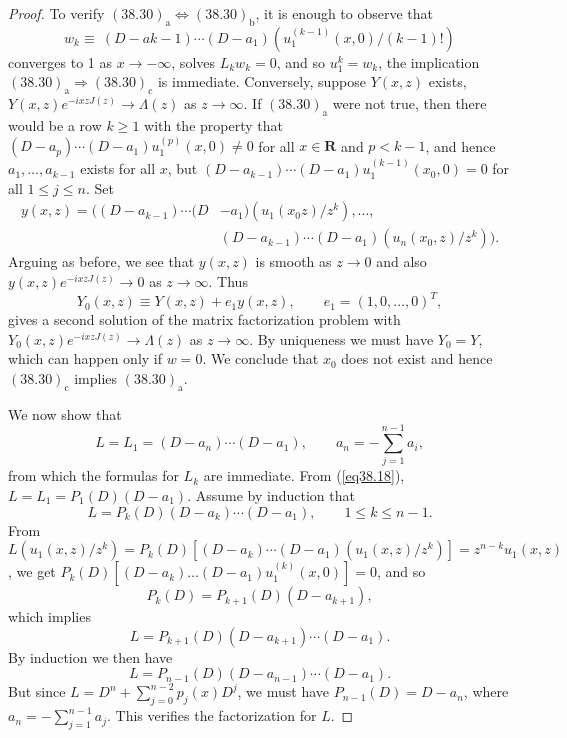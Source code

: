\documentclass{surv-l}
\theoremstyle{plain}
\theoremstyle{definition}
\numberwithin{equation}{chapter}
\begin{document}
\begin{proof}
To verify $(38.30)_{\mathrm{a}}\Leftrightarrow(38.30)_{\mathrm{b}}$, it is enough to observe that
\begin{equation*}
w_{k}\equiv\ (D - ak-1)\cdots(D-a_{1})(u_{1}^{(k-1)}(x,0)/(k-1)!)
\end{equation*}
converges to 1 as $ x\rightarrow-\infty$, solves $L_{k}w_{k}=0$, and so $u_{1}^{k}=w_{k}$, the implication $(38.30)_{\mathrm{a}}\Rightarrow(38.30)_{\mathrm{c}}$ is immediate. Conversely, suppose $Y(x, z)$ exists, $Y(x, z)e^{-ixzJ(z)}\rightarrow\Lambda(z)$ as $ z\rightarrow\infty$. If $(38.30)_{\mathrm{a}}$ were not true, then there would be a row $k\geq 1$ with the property that $(D-a_{p})\cdots(D-a_{1})u_{1}^{(p)}(x, 0)\neq 0$ for all $x\in \mathbf{R}$ and $p<k-1$, and hence $ a_{1},\ldots,a_{k-1}$ exists for all $x$, but $(D-a_{k-1})\cdots (D-a_{1})u_{1}^{(k-1)}(x_{0},0)=0$ for all $1\leq j\leq n$. Set
\begin{align*}
y(x,z)=((D-a_{k-1})\cdots(D&-a_{1})(u_{1}(x_{0}z)/z^{k}),\ldots,\\
&(D-a_{k-1})\cdots(D-a_{1})(u_{n}(x_{0}, z)/z^{k})).
\end{align*}
Arguing as before, we see that $y(x, z)$ is smooth as $z\rightarrow 0$ and also $y(x, z)e^{-ixzJ(z)} \rightarrow 0$ as $ z\rightarrow\infty$. Thus
\begin{equation*}
Y_{0}(x, z)\equiv Y(x,z)+e_{1}y(x, z),\qquad e_{1}=(1,0, \ldots,0)^{T},
\end{equation*}
gives a second solution of the matrix factorization problem with $Y_{0}(x, z)e^{-ixzJ(z)} \rightarrow\Lambda(z)$ as $ z\rightarrow\infty$. By uniqueness we must have $Y_{0}=Y$, which can happen only if $w=0$. We conclude that $x_{0}$ does not exist and hence $(38.30)_{\mathrm{c}}$ implies $(38.30)_{\mathrm{a}}$.

We now show that
\begin{equation*}
L=L_{1}=(D-a_{n})\cdots (D-a_{1}),\qquad a_{n}=-\sum_{j=1}^{n-1}a_{i},
\end{equation*}
from which the formulas for $L_{k}$ are immediate. From (\ref{eq38.18}), $L=L_{1}= P_{1}(D)(D-a_{1})$. Assume by induction that
\begin{equation*}
L=P_{k}(D)(D-a_{k})\cdots(D-a_{1}),\qquad 1\leq k\leq n-1.
\end{equation*}
From $L(u_{1} (x, z)/z^{k})=P_{k}(D)[(D-a_{k})\cdots (D-a_{1})(u_{1}(x,z)/z^{k})]=z^{n-k}u_{1}(x, z)$, we get $P_{k}(D)[(D-a_{k})\ldots(D-a_{1})u_{1}^{(k)}(x, 0)]=0$, and so
\begin{equation*}
P_{k}(D)=P_{k+1}(D)(D-a_{k+1}),
\end{equation*}
which implies
\begin{equation*}
L=P_{k+1}(D)(D-a_{k+1})\cdots(D-a_{1}).
\end{equation*}
By induction we then have
\begin{equation*}
L=P_{n-1}(D)(D-a_{n-1})\cdots(D-a_{1}).
\end{equation*}
But since $L=D^{n}+\sum_{j=0}^{n-2}p_{j}(x)D^{j}$, we must have $P_{n-1}(D)=D-a_{n}$, where $a_{n}=- \sum_{j=1}^{n-1}a_{j}$. This verifies the factorization for $L$.


\end{proof}
\end{document}
